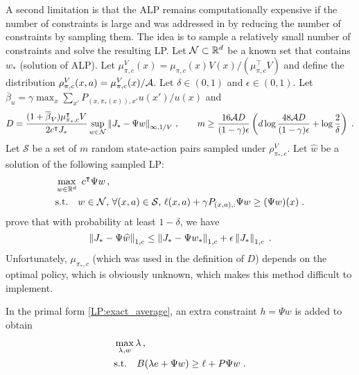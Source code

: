 \documentclass[11pt]{article}
\begin{document}
A second limitation is that the ALP remains computationally expensive if the number of constraints is large and was addressed in \cite{DeFarias-VanRoy-2004} by reducing the number of constraints by sampling them. The idea is to sample a relatively small number of constraints and solve the resulting LP.
Let $\mathcal N\subset \mathbb R^d$ be a known set that contains $w_*$ (solution of ALP). Let $\mu_{\pi, c}^V (x) = \mu_{\pi, c}(x) V(x)/(\mu_{\pi, c}^\top V)$ and define the distribution $\rho_{\pi, c}^V(x,a) = \mu_{\pi, c}^V (x) / {\cal A}$. Let $\delta\in (0,1)$ and $\epsilon\in (0,1)$. Let $\overline\beta_u = \gamma \max_{x} \sum_{x'} P_{(x,\pi_*(x)), x'} u(x')/u(x)$ and
\[
D = \frac{(1+\overline\beta_V) \mu_{\pi_*, c}^\intercal V}{2 c^\intercal J_*} \sup_{w\in \mathcal N} \left\Vert J_* - \Psi w\right\Vert_{\infty, 1/V}\,, \qquad m \ge \frac{16 {\cal A} D}{(1-\gamma)\epsilon} \left( d \log \frac{48 {\cal A} D}{(1-\gamma) \epsilon} + \log\frac{2}{\delta} \right) \; .
\]
Let $\mathcal S$ be a set of $m$ random state-action pairs sampled under $\rho_{\pi_*, c}^V$. Let $\widehat w$ be a solution of the following sampled LP:
\begin{align*}
&\max_{w\in\mathbb R^d}\  c^\intercal \Psi w\,,  \\
&\mbox{s.t.}\quad  w\in \mathcal N,\, \forall (x,a)\in \mathcal S,\, \ell(x,a) + \gamma P_{(x,a),:} \Psi w \ge (\Psi w)(x) \; .
\end{align*}
\citet{DeFarias-VanRoy-2004} prove that with probability at least $1-\delta$, we have
\[
\left\Vert J_* - \Psi \widehat w\right\Vert_{1,c} \le \left\Vert J_* - \Psi  w_*\right\Vert_{1,c} + \epsilon \left\Vert J_*\right\Vert_{1,c} \; .
\]
Unfortunately, $\mu_{\pi_*, c}$ (which was used in the definition of $D$) depends on the optimal policy, which is obviously unknown, which makes this method difficult to implement.

In the primal form \eqref{LP:exact_average}, an extra constraint $h = \Psi w$ is added to obtain
\begin{align}
\label{eq:primal-apprx}
&\max_{\lambda, w} \lambda\,, \\
\notag
&\mbox{s.t.}\quad B(\lambda e + \Psi w) \ge \ell + P \Psi w \; .
\end{align}
\end{document}

